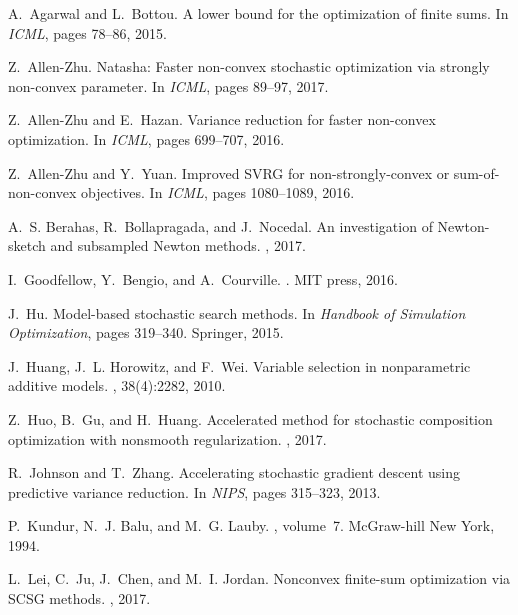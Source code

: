 \documentclass[11pt]{article}
\begin{document}
\begin{thebibliography}{10}
A.~Agarwal and L.~Bottou.
\newblock A lower bound for the optimization of finite sums.
\newblock In {\em ICML}, pages 78--86, 2015.

Z.~Allen-Zhu.
\newblock Natasha: Faster non-convex stochastic optimization via strongly non-convex parameter.
\newblock In {\em ICML}, pages 89--97, 2017.

Z.~Allen-Zhu and E.~Hazan.
\newblock Variance reduction for faster non-convex optimization.
\newblock In {\em ICML}, pages 699--707, 2016.

Z.~Allen-Zhu and Y.~Yuan.
\newblock Improved {SVRG} for non-strongly-convex or sum-of-non-convex objectives.
\newblock In {\em ICML}, pages 1080--1089, 2016.

A.~S. Berahas, R.~Bollapragada, and J.~Nocedal.
\newblock An investigation of {N}ewton-sketch and subsampled {N}ewton methods.
, 2017.

I.~Goodfellow, Y.~Bengio, and A.~Courville.
.
\newblock MIT press, 2016.

J.~Hu.
\newblock Model-based stochastic search methods.
\newblock In {\em Handbook of Simulation Optimization}, pages 319--340. Springer, 2015.

J.~Huang, J.~L. Horowitz, and F.~Wei.
\newblock Variable selection in nonparametric additive models.
, 38(4):2282, 2010.

Z.~Huo, B.~Gu, and H.~Huang.
\newblock Accelerated method for stochastic composition optimization with nonsmooth regularization.
, 2017.

R.~Johnson and T.~Zhang.
\newblock Accelerating stochastic gradient descent using predictive variance reduction.
\newblock In {\em NIPS}, pages 315--323, 2013.

P.~Kundur, N.~J. Balu, and M.~G. Lauby.
, volume~7.
\newblock McGraw-hill New York, 1994.

L.~Lei, C.~Ju, J.~Chen, and M.~I. Jordan.
\newblock Nonconvex finite-sum optimization via {SCSG} methods.
, 2017.


\end{thebibliography}
\end{document}

